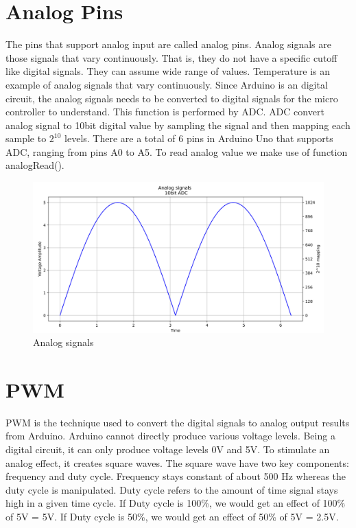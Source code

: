 \section{Analog Pins}
\par The pins that support analog input are called analog pins. Analog signals are those signals that vary continuously. That is, they do not have a specific cutoff like digital signals. They can assume wide range of values. Temperature is an example of analog signals that vary continuously. Since Arduino is an digital circuit, the analog signals needs to be converted to digital signals for the micro controller to understand. This function is performed by \ac{ADC}. \ac{ADC} convert analog signal to 10bit digital value by sampling the signal and then mapping each sample to $2^{10}$ levels. There are a total of 6 pins in Arduino Uno that supports \ac{ADC}, ranging from pins A0 to A5. To read analog value we make use of function analogRead().

\begin{figure}
 \centering
 \includegraphics[width=\textwidth]{Images/Intro_Arduino/analog_graph.png}
 \caption{Analog signals}
\end{figure}

\section{\ac{PWM}}
\ac{PWM} is the technique used to convert the digital signals to analog output results from Arduino. Arduino cannot directly produce various voltage levels. Being a digital circuit, it can only produce voltage levels 0V and 5V. To stimulate an analog effect, it creates square waves. The square wave have two key components: frequency and duty cycle. Frequency stays constant of about 500 Hz whereas the duty cycle is manipulated. Duty cycle refers to the amount of time signal stays high in a given time cycle. If Duty cycle is 100\%, we would get an effect of 100\% of 5V = 5V. If Duty cycle is 50\%, we would get an effect of 50\% of 5V = 2.5V. 

